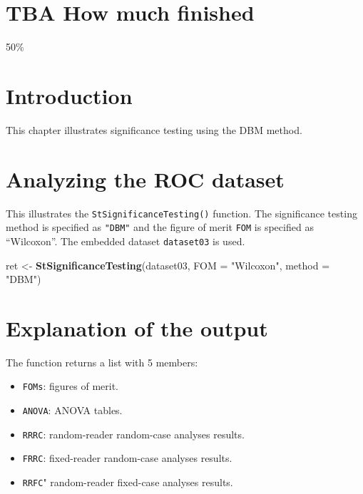 \documentclass[
]{book}
\newenvironment{Shaded}{\begin{snugshade}}{\end{snugshade}}
\newcommand{\DataTypeTok}[1]{\textcolor[rgb]{0.13,0.29,0.53}{#1}}
\newcommand{\KeywordTok}[1]{\textcolor[rgb]{0.13,0.29,0.53}{\textbf{#1}}}
\newcommand{\NormalTok}[1]{#1}
\newcommand{\StringTok}[1]{\textcolor[rgb]{0.31,0.60,0.02}{#1}}
\providecommand{\tightlist}{%
  \setlength{\itemsep}{0pt}\setlength{\parskip}{0pt}}
\begin{document}
\hypertarget{quick-start-dbm-text-how-much-finished}{%
\section{TBA How much finished}\label{quick-start-dbm-text-how-much-finished}}

50\%

\hypertarget{quick-start-dbm-text-intro}{%
\section{Introduction}\label{quick-start-dbm-text-intro}}

This chapter illustrates significance testing using the DBM method.

\hypertarget{quick-start-dbm-text-analyze-dataset}{%
\section{Analyzing the ROC dataset}\label{quick-start-dbm-text-analyze-dataset}}

This illustrates the \texttt{StSignificanceTesting()} function. The significance testing method is specified as \texttt{"DBM"} and the figure of merit \texttt{FOM} is specified as ``Wilcoxon''. The embedded dataset \texttt{dataset03} is used.

\begin{Shaded}
\begin{Highlighting}[]
\NormalTok{ret <-}\StringTok{ }\KeywordTok{StSignificanceTesting}\NormalTok{(dataset03, }\DataTypeTok{FOM =} \StringTok{"Wilcoxon"}\NormalTok{, }\DataTypeTok{method =} \StringTok{"DBM"}\NormalTok{)}
\end{Highlighting}
\end{Shaded}

\hypertarget{quick-start-dbm-text-explanation}{%
\section{Explanation of the output}\label{quick-start-dbm-text-explanation}}

The function returns a list with 5 members:

\begin{itemize}
\tightlist
\item
  \texttt{FOMs}: figures of merit.
\item
  \texttt{ANOVA}: ANOVA tables.
\item
  \texttt{RRRC}: random-reader random-case analyses results.
\item
  \texttt{FRRC}: fixed-reader random-case analyses results.
\item
  \texttt{RRFC}" random-reader fixed-case analyses results.
\end{itemize}
\end{document}

